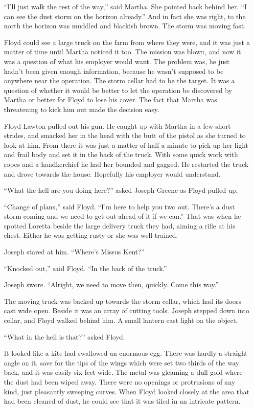 ``I'll just walk the rest of the way,'' said Martha. She pointed back
behind her. ``I can see the dust storm on the horizon already.'' And in
fact she was right, to the north the horizon was muddled and blackish
brown. The storm was moving fast.

Floyd could see a large truck on the farm from where they were, and it
was just a matter of time until Martha noticed it too. The mission was
blown, and now it was a question of what his employer would want. The
problem was, he just hadn't been given enough information, because he
wasn't supposed to be anywhere near the operation. The storm cellar had
to be the target. It was a question of whether it would be better to let
the operation be discovered by Martha or better for Floyd to lose his
cover. The fact that Martha was threatening to kick him out made the
decision easy.

Floyd Lawton pulled out his gun. He caught up with Martha in a few short
strides, and smacked her in the head with the butt of the pistol as she
turned to look at him. From there it was just a matter of half a minute
to pick up her light and frail body and set it in the back of the truck.
With some quick work with ropes and a handkerchief he had her bounded
and gagged. He restarted the truck and drove towards the house.
Hopefully his employer would understand.

``What the hell are you doing here?'' asked Joseph Greene as Floyd
pulled up.

``Change of plans,'' said Floyd. ``I'm here to help you two out. There's
a dust storm coming and we need to get out ahead of it if we can.'' That
was when he spotted Loretta beside the large delivery truck they had,
aiming a rifle at his chest. Either he was getting rusty or she was
well‐trained.

Joseph stared at him. ``Where's Missus Kent?''

``Knocked out,'' said Floyd. ``In the back of the truck.''

Joseph swore. ``Alright, we need to move then, quickly. Come this way.''

The moving truck was backed up towards the storm cellar, which had its
doors cast wide open. Beside it was an array of cutting tools. Joseph
stepped down into cellar, and Floyd walked behind him. A small lantern
cast light on the object.

``What in the hell is that?'' asked Floyd.

It looked like a kite had swallowed an enormous egg. There was hardly a
straight angle on it, save for the tips of the wings which were set two
thirds of the way back, and it was easily six feet wide. The metal was
gleaming a dull gold where the dust had been wiped away. There were no
openings or protrusions of any kind, just pleasantly sweeping curves.
When Floyd looked closely at the area that had been cleaned of dust, he
could see that it was tiled in an intricate pattern.

